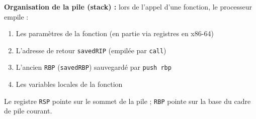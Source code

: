 \documentclass[a4paper,11pt]{article}
\theoremstyle{plain}
\theoremstyle{definition}
\begin{document}
\medskip

\begin{rappel}
\textbf{Organisation de la pile (stack) :} lors de l'appel d'une fonction, le processeur empile :
\begin{enumerate}
    \item Les paramètres de la fonction (en partie via registres en x86-64)
    \item L'adresse de retour \texttt{savedRIP} (empilée par \texttt{call})
    \item L'ancien \texttt{RBP} (\texttt{savedRBP}) sauvegardé par \texttt{push rbp}
    \item Les variables locales de la fonction
\end{enumerate}
Le registre \texttt{RSP} pointe sur le sommet de la pile ; \texttt{RBP} pointe sur la base du cadre de pile courant.
\end{rappel}

\bigskip


\end{document}
